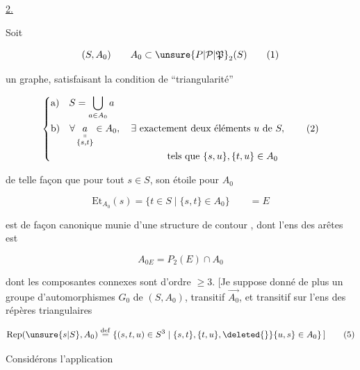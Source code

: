 
\uline{2.}

Soit 

\[
 (S,A_0)\qquad A_0\subset\unsure{P|\mathcal P|\mathfrak P}_2(S) \tag*{(1)}
\]

un graphe, satisfaisant la condition de ``triangularité''

\[
\left\{\begin{aligned}
 &\text{a)}\quad S=\bigcup_{a\in A_0}a\\
 &\text{b)}\quad \forall\,\underset{\substack{\shortparallel\\\{s,t\}}}{a}\in A_0,\quad \exists\ \text{exactement deux éléments }u\text{ de }S,\\
 &\hspace{12em}\text{tels que }\{s,u\},\{t,u\}\in A_0
\end{aligned}\right. \tag*{(2)}
\]

 de telle façon que pour tout $s\in S$, son étoile pour $A_0$

\[
 \mathrm{Et}_{A_0}(s)=\{t\in S\mid\{s,t\}\in A_0\}\qquad =E \tag*{(3)}
\]

est de façon canonique munie d'une structure de contour  , dont l'ens des arêtes est

\[
 A_{0E}=P_2(E)\cap A_0 \tag*{(4)}
\]

dont les composantes connexes sont d'ordre $\geq 3$. [Je suppose donné de plus un groupe d'automorphismes
$G_0$ de $(S,A_0)$, transitif  $\overrightarrow{A_0}$, et  transitif sur l'ens des répères triangulaires

\[
 \mathrm{Rep}(\unsure{s|S},A_0)\overset{\mathrm{def}}{=}
 \{(s,t,u)\in S^3\mid \{s,t\},\{t,u\},\deleted{\}}\{u,s\}\in A_0\}\,] \tag*{(5)}
\]

 Considérons l'application


